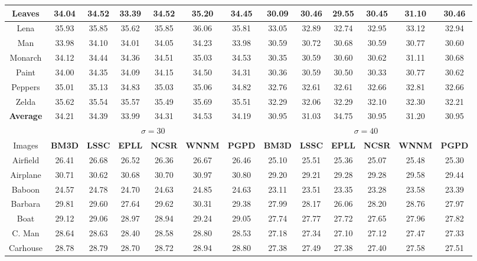 \begin{table}[t]
\begin{adjustwidth}{-0.5cm}{}
\begin{center}
\begin{tabular}{|c||c|c|c|c|c|c||c|c|c|c|c|c|}
\\
\hline
 Leaves &34.04&34.52&33.39&34.52&35.20& 34.45   &30.09&30.46&29.55&30.45 &31.10&30.46 
\\
\hline
 Lena &35.93 &35.85&35.62&35.85&36.06&35.81    &33.05 &32.89&32.74&32.95&33.12&32.94  
\\
\hline
 Man &33.98 &34.10&34.01&34.05&34.23&33.98    &30.59&30.72&30.68&30.59 &30.77&30.60   
\\
\hline
 Monarch &34.12&34.44&34.36 &34.51&35.03&34.53     &30.35 &30.59&30.60 &30.62&31.11&30.68
\\
\hline
 Paint &34.00&34.35&34.09&34.15&34.50&34.31     &30.36&30.59 &30.50&30.33&30.77&30.62  
\\
\hline
 Peppers &35.01&35.13&34.83 &35.03&35.06&34.82    &32.76&32.61 &32.61&32.66&32.81&32.66 
\\
\hline
 Zelda &35.62&35.54&35.57 &35.49&35.69&35.51     &32.29 &32.06 &32.29&32.10&32.30 &32.21
\\
\hline
 \textbf{Average} &34.21&34.39&33.99 &34.31&34.53&34.19  &30.95 &31.03 &34.75&30.95&31.20&30.95   
\\
\hline
\hline
&\multicolumn{6}{c||}{ $\sigma = 30$}&\multicolumn{6}{c|}{ $\sigma = 40$}
\\
\hline
\hline
Images&\textbf{BM3D}&\textbf{LSSC}&\textbf{EPLL}&\textbf{NCSR}&\textbf{WNNM}&\textbf{PGPD}
&\textbf{BM3D}&\textbf{LSSC}&\textbf{EPLL}&\textbf{NCSR}&\textbf{WNNM}&\textbf{PGPD} 
\\
\hline
Airfield& 26.41 & 26.68 & 26.52  &  26.36  & 26.67 & 26.46     & 25.10 &  25.51  & 25.36 & 25.07 & 25.48 & 25.30 
\\
\hline
Airplane&  30.71  & 30.62  &  30.68  &  30.70 & 30.97 & 30.80    & 29.20 & 29.21  & 29.28 & 29.28 & 29.58 & 29.44
\\
\hline
 Baboon & 24.57   & 24.78  & 24.70   & 24.63  & 24.85 & 24.63   &  23.11 &  23.51  & 23.35 & 23.28 & 23.58 & 23.39   
\\
\hline 
 Barbara & 29.81  & 29.60 & 27.64 & 29.62 & 30.31 & 29.38   &  27.99 & 28.17 & 26.06 & 28.20 & 28.76 & 27.97
\\
\hline
 Boat & 29.12  & 29.06  & 28.97 & 28.94 & 29.24 &  29.05   &  27.74& 27.77  &  27.72 & 27.65 &27.96  & 27.82    
\\
\hline
 C. Man& 28.64 & 28.63 & 28.40  & 28.58 & 28.80& 28.53     & 27.18& 27.34  & 27.10 &27.12  &27.47 & 27.33
\\
\hline
 Carhouse& 28.78 & 28.79   & 28.70    & 28.72 & 28.94 & 28.80   & 27.38 &  27.49 & 27.38 & 27.40 & 27.58 & 27.51

\end{tabular}
\end{center}
\end{adjustwidth}
\end{table}
